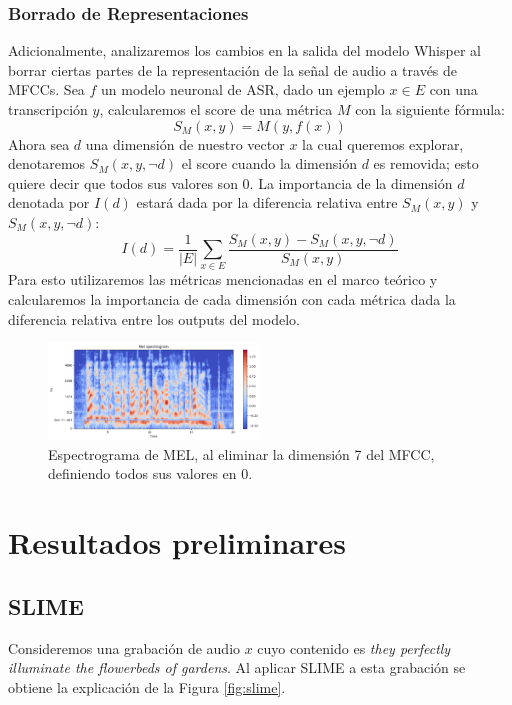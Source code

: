 \documentclass[conference]{IEEEtran}
\begin{document}
\subsubsection{Borrado de Representaciones}
Adicionalmente, analizaremos los cambios en la salida del modelo Whisper al borrar ciertas partes de la representación de la señal de audio a través de MFCCs.
Sea $f$ un modelo neuronal de ASR, dado un ejemplo $x \in E$ con una transcripción $y$, calcularemos el score de una métrica $M$ con la siguiente fórmula:
\begin{equation}
    S_{M}(x,y) = M(y, f(x))
\end{equation}
Ahora sea $d$ una dimensión de nuestro vector $x$ la cual queremos explorar, denotaremos $S_{M}(x,y,\neg d)$ el score cuando la dimensión $d$ es removida; esto quiere decir que todos sus valores son 0.
La importancia de la dimensión $d$ denotada por $I(d)$ estará dada por la diferencia relativa entre $S_{M}(x,y)$ y $S_{M}(x,y,\neg d)$:
\begin{equation} \label{eq:imp}
    I(d) = \frac{1}{|E|} \sum_{x \in E} \frac{S_{M}(x,y) - S_{M}(x,y,\neg d)}{S_{M}(x,y)}
\end{equation}
Para esto utilizaremos las métricas mencionadas en el marco teórico y calcularemos la importancia de cada dimensión con cada métrica dada la diferencia relativa entre los outputs del modelo.

\begin{figure}[H]
\centering
\includegraphics[width=0.5\textwidth]{images/mel_erasure.png}
\caption{Espectrograma de MEL, al eliminar la dimensión 7 del MFCC, definiendo todos sus valores en 0.}
\end{figure}

\section{Resultados preliminares}

\subsection{SLIME}

Consideremos una grabación de audio $x$ cuyo contenido es \textit{they perfectly illuminate the flowerbeds of gardens}. Al aplicar SLIME a esta grabación se obtiene la explicación de la Figura \ref{fig:slime}.
\end{document}
